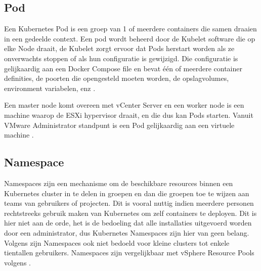 \subsection{Pod}
Een Kubernetes Pod is een groep van 1 of meerdere containers die samen draaien in een gedeelde context. Een pod wordt beheerd door de Kubelet software die op elke Node draait, de Kubelet zorgt ervoor dat Pods herstart worden als ze onverwachts stoppen of als hun configuratie is gewijzigd. Die configuratie is gelijkaardig aan een Docker Compose file en bevat één of meerdere container definities, de poorten die opengesteld moeten worden, de opslagvolumes, environment variabelen, enz 
\autocite{NirShtein2023}.

Een master node komt overeen met vCenter Server en een worker node is een machine waarop de ESXi hypervisor draait, en die dus kan Pods starten. Vanuit VMware Administrator standpunt is een Pod gelijkaardig aan een virtuele machine \autocite{VMware2019}.


\subsection{Namespace}
Namespaces zijn een mechanisme om de beschikbare resources binnen een Kubernetes cluster in te delen in groepen en dan die groepen toe te wijzen aan teams van gebruikers of projecten. Dit is vooral nuttig indien meerdere personen rechtstreeks gebruik maken van Kubernetes om zelf containers te deployen. Dit is hier niet aan de orde, het is de bedoeling dat alle installaties uitgevoerd worden door een administrator, dus Kubernetes Namespaces zijn hier van geen belang. Volgens \textcite{Kubernetes2023c} zijn Namespaces ook niet bedoeld voor kleine clusters tot enkele tientallen gebruikers. Namespaces zijn vergelijkbaar met vSphere Resource Pools volgens \textcite{VMware2019}.

